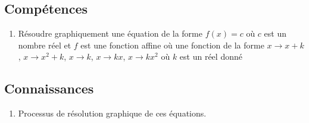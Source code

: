 \documentclass[12pt,a4paper]{article}
\begin{document}
\subsection*{Compétences}
\begin{enumerate}
	\item Résoudre graphiquement une équation de la forme $f(x)=c$ où $c$ est un nombre réel et $f$ est une fonction affine où une fonction de la forme $x \rightarrow x+k$, $x \rightarrow x^2+k$, $x \rightarrow k$, $x \rightarrow kx$, $x \rightarrow kx^2$ où $k$ est un réel donné
\end{enumerate}

\subsection*{Connaissances}
\begin{enumerate}
	\item Processus de résolution graphique de ces équations.
	
\end{enumerate}
\end{document}
